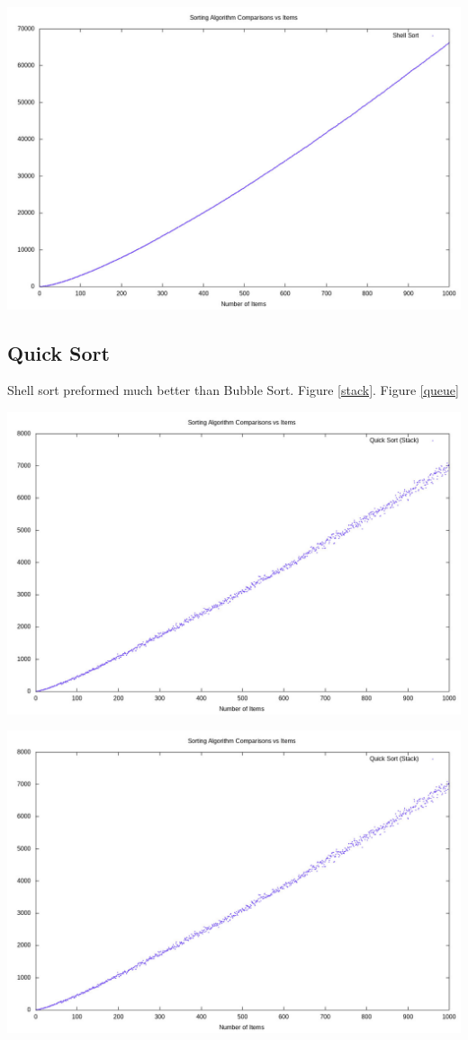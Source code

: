 \documentclass[12pt]{article}
\begin{document}
		\includegraphics[width=\textwidth]{shell} \label{shell}

	\subsection{Quick Sort}

	Shell sort preformed much better than Bubble Sort. Figure \ref{stack}. Figure \ref{queue}

		\includegraphics[width=\textwidth]{quick_stack} \label{stack}

		\includegraphics[width=\textwidth]{quick_stack} \label{queue}
\end{document}

